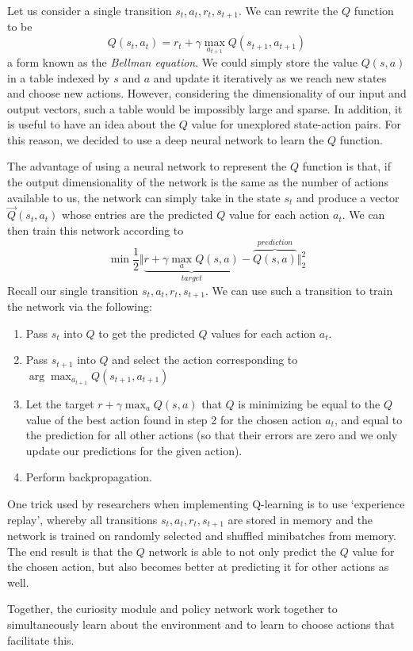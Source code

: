 \documentclass[conference, 12pt]{IEEEtran} %
\begin{document}
	\par Let us consider a single transition $s_t, a_t, r_t, s_{t+1}$. We can rewrite the $Q$ function to be
	$$
	Q(s_t, a_t) = r_t + \gamma \max_{a_{t+1}} Q(s_{t+1}, a_{t+1})
	$$
	a form known as the \textit{Bellman equation}. We could simply store the value $Q(s,a)$ in a table indexed by $s$ and $a$ and update it iteratively as we reach new states and choose new actions. However, considering the dimensionality of our input and output vectors, such a table would be impossibly large and sparse. In addition, it is useful to have an idea about the $Q$ value for unexplored state-action pairs. For this reason, we decided to use a deep neural network to learn the $Q$ function.
	\par The advantage of using a neural network to represent the $Q$ function is that, if the output dimensionality of the network is the same as the number of actions available to us, the network can simply take in the state $s_t$ and produce a vector $\vec{Q}(s_t, a_t)$ whose entries are the predicted $Q$ value for each action $a_t$. We can then train this network according to
	$$
	\min \frac{1}{2} \Vert \underbrace{r + \gamma \max_{a} Q(s, a)}_{target}
	-
	\overbrace{Q(s,a)}^{prediction} \Vert ^2 _2
	$$
	Recall our single transition $s_t, a_t, r_t, s_{t+1}$. We can use such a transition to train the network via the following:
	\begin{enumerate}
		\item Pass $s_t$ into $Q$ to get the predicted $Q$ values for each action $a_t$.
		\item Pass $s_{t+1}$ into $Q$ and select the action corresponding to $\arg \max_{a_{t+1}} Q(s_{t+1}, a_{t+1})$
		\item Let the target $r + \gamma \max_{a} Q(s, a)$ that $Q$ is minimizing be equal to the $Q$ value of the best action found in step 2 for the chosen action $a_t$, and equal to the prediction for all other actions (so that their errors are zero and we only update our predictions for the given action).
		\item Perform backpropagation.
	\end{enumerate}
	\par One trick used by researchers when implementing Q-learning is to use `experience replay', whereby all transitions $s_t, a_t, r_t, s_{t+1}$ are stored in memory and the network is trained on randomly selected and shuffled minibatches from memory. The end result is that the $Q$ network is able to not only predict the $Q$ value for the chosen action, but also becomes better at predicting it for other actions as well.
	\par Together, the curiosity module and policy network work together to simultaneously learn about the environment and to learn to choose actions that facilitate this.
\end{document}
